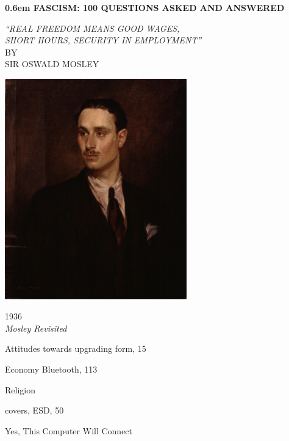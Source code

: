 \documentclass{book}
\begin{document}
\pagecolor{black}
\color{white}%
\clearpage
\newcommand\nbvspace[1][3]{\vspace*{\stretch{#1}}}
\newcommand\nbstretchyspace{\spaceskip0.5em plus 0.25em minus 0.25em}
\newcommand{\nbtitlestretch}{\spaceskip0.6em}
\begin{center}
\bfseries
\nbvspace[1]
\Huge
{\nbtitlestretch\huge
    \textbf{FASCISM}: 100 QUESTIONS ASKED AND ANSWERED}

\nbvspace[1]
\normalsize
    \textit{
``REAL FREEDOM MEANS GOOD WAGES,\\
SHORT HOURS, SECURITY IN EMPLOYMENT''\\
}
\nbvspace[1]
\small BY\\
    \Large SIR OSWALD MOSLEY\\[0.5em]

\nbvspace[2]

\includegraphics[width=3.1in]{./img/1.jpg}
\nbvspace[3]
\normalsize

1936\\
\large
    \textit{Mosley Revisited}
\nbvspace[1]
\end{center}
\newpage
{}
\pagecolor{white}
\color{black}
\begin{theindex}
 \item Attitudes towards
  \subitem upgrading form, 15
\indexspace
 \item Economy
  \subitem Bluetooth, 113
 \item Religion
\indexspace
 \item covers, ESD, 50
\indexspace
 \item Yes, This Computer Will Connect
\end{theindex}
\end{document}
